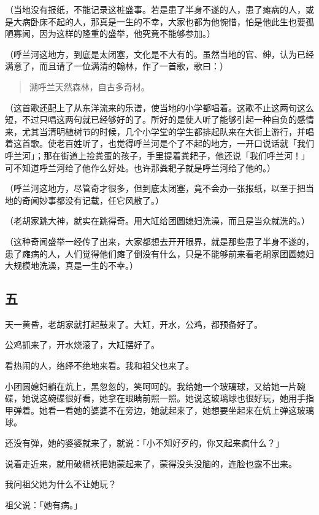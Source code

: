\documentclass[UTF8]{ctexart}
\begin{document}
（当地没有报纸，不能记录这桩盛事。若是患了半身不遂的人，患了瘫病的人，或是大病卧床不起的人，那真是一生的不幸，大家也都为他惋惜，怕是他此生也要孤陋寡闻，因为这样的隆重的盛举，他究竟不能够参加。）

（呼兰河这地方，到底是太闭塞，文化是不大有的。虽然当地的官、绅，认为已经满意了，而且请了一位满清的翰林，作了一首歌，歌曰：）

\begin{verse}
    溯呼兰天然森林，自古多奇材。
\end{verse}

（这首歌还配上了从东洋流来的乐谱，使当地的小学都唱着。这歌不止这两句这么短，不过只唱这两句就已经够好的了。所好的是使人听了能够引起一种自负的感情来，尤其当清明植树节的时候，几个小学堂的学生都排起队来在大街上游行，并唱着这首歌。使老百姓听了，也觉得呼兰河是个了不起的地方，一开口说话就「我们呼兰河」；那在街道上捡粪蛋的孩子，手里提着粪耙子，他还说「我们呼兰河！」可不知道呼兰河给了他作么好处。也许那粪耙子就是呼兰河给了他的。）

（呼兰河这地方，尽管奇才很多，但到底太闭塞，竟不会办一张报纸，以至于把当地的奇闻妙事都没有记载，任它风散了。）

（老胡家跳大神，就实在跳得奇。用大缸给团圆媳妇洗澡，而且是当众就洗的。）

（这种奇闻盛举一经传了出来，大家都想去开开眼界，就是那些患了半身不遂的，患了瘫病的人，人们觉得他们瘫了倒没有什么，只是不能够前来看老胡家团圆媳妇大规模地洗澡，真是一生的不幸。）

\subsection{五}

天一黄昏，老胡家就打起鼓来了。大缸，开水，公鸡，都预备好了。

公鸡抓来了，开水烧滚了，大缸摆好了。

看热闹的人，络绎不绝地来看。我和祖父也来了。

小团圆媳妇躺在炕上，黑忽忽的，笑呵呵的。我给她一个玻璃球，又给她一片碗碟，她说这碗碟很好看，她拿在眼睛前照一照。她说这玻璃球也很好玩，她用手指甲弹着。她看一看她的婆婆不在旁边，她就起来了，她想要坐起来在炕上弹这玻璃球。

还没有弹，她的婆婆就来了，就说：「小不知好歹的，你又起来疯什么？」

说着走近来，就用破棉袄把她蒙起来了，蒙得没头没脑的，连脸也露不出来。

我问祖父她为什么不让她玩？

祖父说：「她有病。」
\end{document}
